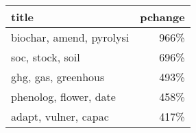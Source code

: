 \begin{tabular}{p{1.2cm}r}
\toprule
                    title &  pchange \\
\midrule
 biochar, amend, pyrolysi &     966\% \\
         soc, stock, soil &     696\% \\
      ghg, gas, greenhous &     493\% \\
   phenolog, flower, date &     458\% \\
     adapt, vulner, capac &     417\% \\
\bottomrule
\end{tabular}
